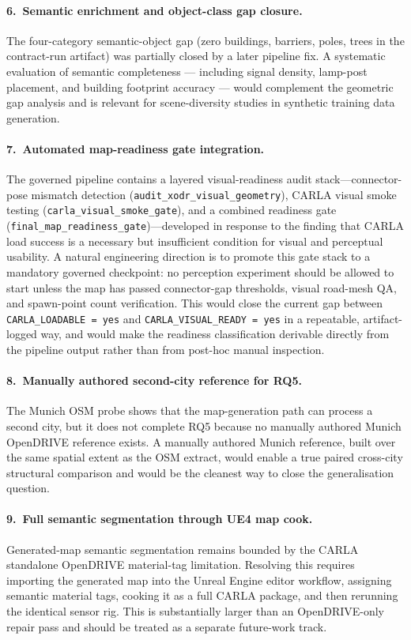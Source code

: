 \paragraph{6.\ Semantic enrichment and object-class gap closure.}
The four-category semantic-object gap (zero buildings, barriers, poles, trees in the contract-run artifact) was partially closed by a later pipeline fix. A systematic evaluation of semantic completeness --- including signal density, lamp-post placement, and building footprint accuracy --- would complement the geometric gap analysis and is relevant for scene-diversity studies in synthetic training data generation.

\paragraph{7.\ Automated map-readiness gate integration.}
The governed pipeline contains a layered visual-readiness audit
stack---connector-pose mismatch detection
(\texttt{audit\_xodr\_visual\_geometry}), CARLA visual smoke testing
(\texttt{carla\_visual\_smoke\_gate}), and a combined readiness gate
(\texttt{final\_map\_readiness\_gate})---developed in response to the
finding that CARLA load success is a necessary but insufficient condition
for visual and perceptual usability. A natural engineering direction is
to promote this gate stack to a mandatory governed checkpoint: no
perception experiment should be allowed to start unless the map has
passed connector-gap thresholds, visual road-mesh QA, and spawn-point
count verification. This would close the current gap between
\texttt{CARLA\_LOADABLE\,=\,yes} and \texttt{CARLA\_VISUAL\_READY\,=\,yes}
in a repeatable, artifact-logged way, and would make the readiness
classification derivable directly from the pipeline output rather than
from post-hoc manual inspection.

\paragraph{8.\ Manually authored second-city reference for RQ5.}
The Munich OSM probe shows that the map-generation path can process a second city, but it does not complete RQ5 because no manually authored Munich OpenDRIVE reference exists. A manually authored Munich reference, built over the same spatial extent as the OSM extract, would enable a true paired cross-city structural comparison and would be the cleanest way to close the generalisation question.

\paragraph{9.\ Full semantic segmentation through UE4 map cook.}
Generated-map semantic segmentation remains bounded by the CARLA standalone OpenDRIVE material-tag limitation. Resolving this requires importing the generated map into the Unreal Engine editor workflow, assigning semantic material tags, cooking it as a full CARLA package, and then rerunning the identical sensor rig. This is substantially larger than an OpenDRIVE-only repair pass and should be treated as a separate future-work track.

